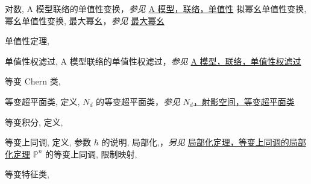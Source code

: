 \begin{theindex}
\subitem \leavevmode\hypertarget{idx:0902}{对数},\enspace{}
\subitem \leavevmode\hypertarget{idx:0903}{A 模型联络的单值性变换}，\textit{参见} \hyperlink{idx:0011}{A 模型，联络，单值性}
\subitem \leavevmode\hypertarget{idx:0904}{拟幂幺单值性变换},\enspace{}
\subitem \leavevmode\hypertarget{idx:0905}{幂幺单值性变换},\enspace{}
\subsubitem \leavevmode\hypertarget{idx:0906}{最大幂幺}，\textit{参见} \hyperlink{idx:0765}{最大幂幺}
\indexspace
\item \leavevmode\hypertarget{idx:0900}{单值性定理},\enspace{}
\indexspace
\item \leavevmode\hypertarget{idx:0907}{单值性权滤过},\enspace{}
\subitem \leavevmode\hypertarget{idx:0908}{A 模型联络的单值性权滤过}，\textit{参见} \hyperlink{idx:0012}{A 模型，联络，单值性权滤过}
\indexspace
\item \leavevmode\hypertarget{idx:0243}{等变 Chern 类},\enspace{}
\indexspace
\item \leavevmode\hypertarget{idx:0250}{等变超平面类},\enspace{}
\subitem \leavevmode\hypertarget{idx:0251}{定义},\enspace{}
\subitem \leavevmode\hypertarget{idx:0252}{$N_d$ 的等变超平面类}，\textit{参见} \hyperlink{idx:0930}{$N_d$，射影空间，等变超平面类}
\indexspace
\item \leavevmode\hypertarget{idx:0253}{等变积分},\enspace{}
\subitem \leavevmode\hypertarget{idx:0254}{定义},\enspace{}
\indexspace
\item \leavevmode\hypertarget{idx:0244}{等变上同调},\enspace{}
\subitem \leavevmode\hypertarget{idx:0245}{定义},\enspace{}
\subitem \leavevmode\hypertarget{idx:0246}{参数 $\hbar$ 的说明},\enspace{}
\subitem \leavevmode\hypertarget{idx:0247}{局部化},\enspace{}，\textit{另见} \hyperlink{idx:0739}{局部化定理，等变上同调的局部化定理}
\subitem \leavevmode\hypertarget{idx:0248}{$\mathbb P^n$ 的等变上同调},\enspace{}
\subitem \leavevmode\hypertarget{idx:0249}{限制映射},\enspace{}
\indexspace
\item \leavevmode\hypertarget{idx:0242}{等变特征类},\enspace{}
\indexspace

\end{theindex}
